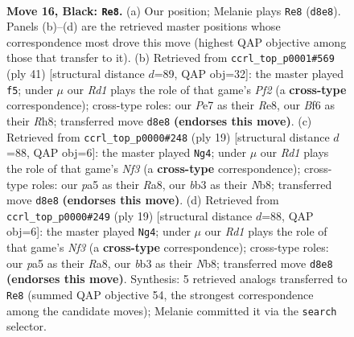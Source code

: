 \documentclass[11pt]{article}
\begin{document}
\clearpage

\begin{figure}[p]\centering
\begin{subfigure}{0.46\textwidth}\centering
\resizebox{\linewidth}{!}{%
\newchessgame
\chessboard[
  setfen={rnbr2k1/pppnp2p/5b2/P6R/2P3P1/1B3N2/1P3P2/RNB1K3 b Q - 0 16},
  showmover=false,
  pgfstyle=straightmove, color=movearrow, markmove={d8-e8}
]}
\caption{}
\end{subfigure}\hfill
\begin{subfigure}{0.46\textwidth}\centering
\resizebox{\linewidth}{!}{%
\newchessgame
\chessboard[
  setfen={2k1r2r/ppp2pp1/2n3b1/4n3/4N2P/P1PP4/4PKB1/1RB4R b - - 8 21},
  showmover=false,
  pgfstyle=straightmove, color=movearrow, markmove={f7-f5}
]}
\caption{}
\end{subfigure}
\\[4pt]
\begin{subfigure}{0.46\textwidth}\centering
\resizebox{\linewidth}{!}{%
\newchessgame
\chessboard[
  setfen={rnb1kb1r/pp3ppp/5n2/4P3/4P3/2N5/PP4PP/R1BK1BNR b kq - 0 10},
  showmover=false,
  pgfstyle=straightmove, color=movearrow, markmove={f6-g4}
]}
\caption{}
\end{subfigure}\hfill
\begin{subfigure}{0.46\textwidth}\centering
\resizebox{\linewidth}{!}{%
\newchessgame
\chessboard[
  setfen={rnb1kb1r/pp3ppp/5n2/4P3/4P3/2N5/PP4PP/R1BK1BNR b kq - 0 10},
  showmover=false,
  pgfstyle=straightmove, color=movearrow, markmove={f6-g4}
]}
\caption{}
\end{subfigure}
\caption{\textbf{Move 16, Black: \texttt{Re8}.} (a) Our position; Melanie plays \texttt{Re8} (\texttt{d8e8}). Panels (b)--(d) are the retrieved master positions whose correspondence most drove this move (highest QAP objective among those that transfer to it). (b) Retrieved from \texttt{ccrl\_top\_p0001\#569} (ply 41) [structural distance $d$=89, QAP obj=32]: the master played \texttt{f5}; under $\mu$ our \emph{Rd1} plays the role of that game's \emph{Pf2} (a \textbf{cross-type} correspondence); cross-type roles: our \emph{P}e7 as their \emph{R}e8, our \emph{B}f6 as their \emph{R}h8; transferred move \texttt{d8e8} \textbf{(endorses this move)}. (c) Retrieved from \texttt{ccrl\_top\_p0000\#248} (ply 19) [structural distance $d$=88, QAP obj=6]: the master played \texttt{Ng4}; under $\mu$ our \emph{Rd1} plays the role of that game's \emph{Nf3} (a \textbf{cross-type} correspondence); cross-type roles: our \emph{p}a5 as their \emph{R}a8, our \emph{b}b3 as their \emph{N}b8; transferred move \texttt{d8e8} \textbf{(endorses this move)}. (d) Retrieved from \texttt{ccrl\_top\_p0000\#249} (ply 19) [structural distance $d$=88, QAP obj=6]: the master played \texttt{Ng4}; under $\mu$ our \emph{Rd1} plays the role of that game's \emph{Nf3} (a \textbf{cross-type} correspondence); cross-type roles: our \emph{p}a5 as their \emph{R}a8, our \emph{b}b3 as their \emph{N}b8; transferred move \texttt{d8e8} \textbf{(endorses this move)}. Synthesis: 5 retrieved analogs transferred to \texttt{Re8} (summed QAP objective 54, the strongest correspondence among the candidate moves); Melanie committed it via the \texttt{search} selector.}
\label{fig:thought-m31}
\end{figure}
\end{document}
